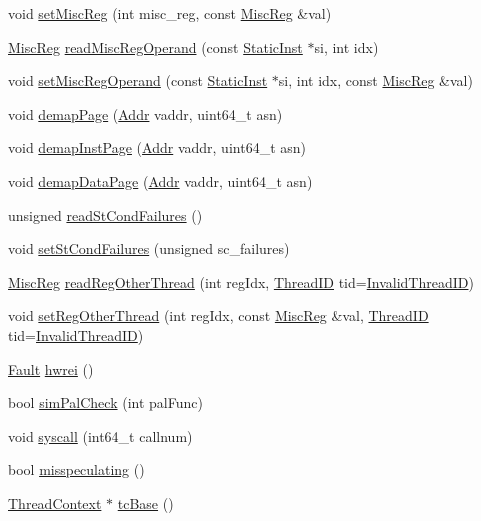 \begin{DoxyCompactItemize}
\item 
void \hyperlink{classBaseSimpleCPU_a1877dde4f3eb17a8b7d33ea40176c148}{setMiscReg} (int misc\_\-reg, const \hyperlink{classBaseSimpleCPU_aaf5f073a387db0556d1db4bcc45428bc}{MiscReg} \&val)
\item 
\hyperlink{classBaseSimpleCPU_aaf5f073a387db0556d1db4bcc45428bc}{MiscReg} \hyperlink{classBaseSimpleCPU_ac6d0dc1a63cede82f4242d43236a98db}{readMiscRegOperand} (const \hyperlink{classStaticInst}{StaticInst} $\ast$si, int idx)
\item 
void \hyperlink{classBaseSimpleCPU_a6cfad8f780bab7feb893941cb0d46160}{setMiscRegOperand} (const \hyperlink{classStaticInst}{StaticInst} $\ast$si, int idx, const \hyperlink{classBaseSimpleCPU_aaf5f073a387db0556d1db4bcc45428bc}{MiscReg} \&val)
\item 
void \hyperlink{classBaseSimpleCPU_a2d698ff909513b48a1263f8a5440e067}{demapPage} (\hyperlink{base_2types_8hh_af1bb03d6a4ee096394a6749f0a169232}{Addr} vaddr, uint64\_\-t asn)
\item 
void \hyperlink{classBaseSimpleCPU_ac8a36d45a839b07f50b73f1eee119615}{demapInstPage} (\hyperlink{base_2types_8hh_af1bb03d6a4ee096394a6749f0a169232}{Addr} vaddr, uint64\_\-t asn)
\item 
void \hyperlink{classBaseSimpleCPU_a26789603cc94992d18f8ddedfff96acf}{demapDataPage} (\hyperlink{base_2types_8hh_af1bb03d6a4ee096394a6749f0a169232}{Addr} vaddr, uint64\_\-t asn)
\item 
unsigned \hyperlink{classBaseSimpleCPU_a25b995a791e41965e088d8bf3f2bf859}{readStCondFailures} ()
\item 
void \hyperlink{classBaseSimpleCPU_abbe779fa43c72cd485ddb736ab17ff61}{setStCondFailures} (unsigned sc\_\-failures)
\item 
\hyperlink{classBaseSimpleCPU_aaf5f073a387db0556d1db4bcc45428bc}{MiscReg} \hyperlink{classBaseSimpleCPU_ac4382c0931786c368f26b645332022e0}{readRegOtherThread} (int regIdx, \hyperlink{base_2types_8hh_ab39b1a4f9dad884694c7a74ed69e6a6b}{ThreadID} tid=\hyperlink{base_2types_8hh_a192b210a26f038691d0f095d85dc0953}{InvalidThreadID})
\item 
void \hyperlink{classBaseSimpleCPU_a6674d3dd977dcee573918b5d2d45b8ef}{setRegOtherThread} (int regIdx, const \hyperlink{classBaseSimpleCPU_aaf5f073a387db0556d1db4bcc45428bc}{MiscReg} \&val, \hyperlink{base_2types_8hh_ab39b1a4f9dad884694c7a74ed69e6a6b}{ThreadID} tid=\hyperlink{base_2types_8hh_a192b210a26f038691d0f095d85dc0953}{InvalidThreadID})
\item 
\hyperlink{classRefCountingPtr}{Fault} \hyperlink{classBaseSimpleCPU_a5f42e07ae335dff417664e91518c7f1e}{hwrei} ()
\item 
bool \hyperlink{classBaseSimpleCPU_a461205960be9d52e9beda48a77e9c600}{simPalCheck} (int palFunc)
\item 
void \hyperlink{classBaseSimpleCPU_a36e0b96120fcbbc2ee8699158f7be5c2}{syscall} (int64\_\-t callnum)
\item 
bool \hyperlink{classBaseSimpleCPU_a99768639c728ee835cce54b8b42b3d8f}{misspeculating} ()
\item 
\hyperlink{classThreadContext}{ThreadContext} $\ast$ \hyperlink{classBaseSimpleCPU_ad33756f3e96ee445dca8d69b1dd8709c}{tcBase} ()
\end{DoxyCompactItemize}

